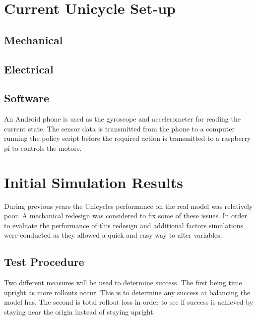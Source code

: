 \documentclass[twoside,twocolumn,12pt]{article}
\begin{document}
\section{Current Unicycle Set-up}


\subsection{Mechanical}



\subsection{Electrical}
\subsection{Software}

An Android phone is used as the gyroscope and accelerometer for reading the current state. The sensor data is transmitted from the phone to a computer running the policy script before the required action is transmitted to a raspberry pi to controls the motors.


\clearpage
\section{Initial Simulation Results}

During previous years the Unicycles performance on the real model was relatively poor. A mechanical redesign was considered to fix some of these issues. In order to evaluate the performance of this redesign and additional factors simulations were conducted as they allowed a quick and easy way to alter variables.
\newline

\subsection{Test Procedure}

Two different measures will be used to determine success. The first being time upright as more rollouts occur. This is to determine any success at balancing the model has. The second is total rollout loss in order to see if success is achieved by staying near the origin instead of staying upright.
\end{document}
